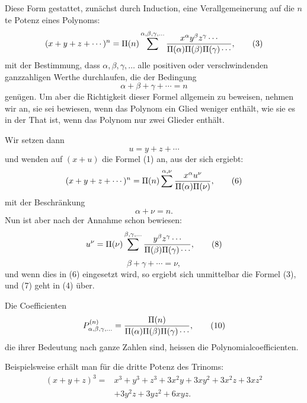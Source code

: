 \documentclass[11pt]{article}
\begin{document}
Diese Form gestattet, zunächst durch Induction, eine Verallgemeinerung auf die $n$te Potenz eines Polynoms:
\begin{equation}
 (x+y+z+\cdots)^n=\Pi(n)\sum^{\alpha,\beta,\gamma,\ldots}
 {x^\alpha y^\beta z^\gamma\cdots
\over \Pi(\alpha)\Pi(\beta)\Pi(\gamma)\cdots},
\tag{3}
\end{equation}
mit der Bestimmung, dass $\alpha,\beta,\gamma,\ldots$ alle positiven oder verschwindenden ganzzahligen Werthe durchlaufen, die der Bedingung
\begin{equation}
 \alpha+\beta+\gamma+\cdots=n
\tag{4}
\end{equation}
genügen. Um aber die Richtigkeit dieser Formel allgemein zu beweisen, nehmen wir an, sie sei bewiesen, wenn das Polynom ein Glied weniger enthält, wie sie es in der That ist, wenn das Polynom nur zwei Glieder enthält.

Wir setzen dann
\begin{equation}
 u=y+z+\cdots
\tag{5}
\end{equation}
und wenden auf $(x+u)$ die Formel (1) an, aus der sich ergiebt:
\begin{equation}
 (x+y+z+\cdots)^n=\Pi(n)\sum^{\alpha,\nu}{x^\alpha u^\nu
\over \Pi(\alpha)\Pi(\nu)},
\tag{6}
\end{equation}
mit der Beschränkung
\begin{equation}
 \alpha+\nu=n.
\tag{7}
\end{equation}
Nun ist aber nach der Annahme schon bewiesen:
\begin{equation}
 u^\nu=\Pi(\nu)\sum^{\beta,\gamma,\ldots}
 {y^\beta z^\gamma\cdots
\over \Pi(\beta)\Pi(\gamma)\cdots},
\tag{8}
\end{equation}
\begin{equation}
 \beta+\gamma+\cdots=\nu,
\tag{9}
\end{equation}
und wenn dies in (6) eingesetzt wird, so ergiebt sich unmittelbar die Formel (3), und (7) geht in (4) über.

Die Coefficienten
\begin{equation}
 P_{\alpha,\beta,\gamma,\ldots}^{(n)}={\Pi(n)\over
 \Pi(\alpha)\Pi(\beta)\Pi(\gamma)\cdots},
\tag{10}
\end{equation}
die ihrer Bedeutung nach ganze Zahlen sind, heissen die Polynomialcoefficienten.

Beispielsweise erhält man für die dritte Potenz des Trinoms:
\begin{equation}
\begin{aligned}
(x+y+z)^3={}&x^3+y^3+z^3+3x^2y+3xy^2+3x^2z+3xz^2\\
&+3y^2z+3yz^2+6xyz.
\end{aligned}
\tag{11}
\end{equation}
\end{document}
